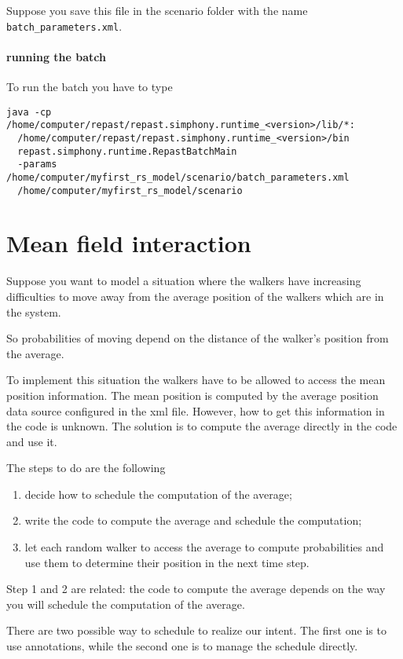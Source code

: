 \documentclass{article}
\begin{document}
Suppose you save this file in the scenario folder with the name \verb+batch_parameters.xml+.

\paragraph{running the batch}

To run the batch you have to type

\begin{verbatim}
java -cp /home/computer/repast/repast.simphony.runtime_<version>/lib/*:
  /home/computer/repast/repast.simphony.runtime_<version>/bin 
  repast.simphony.runtime.RepastBatchMain 
  -params /home/computer/myfirst_rs_model/scenario/batch_parameters.xml 
  /home/computer/myfirst_rs_model/scenario
\end{verbatim}

\section{Mean field interaction}

Suppose you want to model a situation where the walkers have increasing difficulties to move away from the average position of the walkers which are in the system.

So probabilities of moving depend on the distance of the walker's position from the average. 

To implement this situation the walkers have to be allowed to access the mean position information. 
The mean position is computed by the average position data source configured in the xml file. However, how to get this information in the code is unknown. The solution is to compute the average directly in the code and use it.

The steps to do are the following
\begin{enumerate}
	\item decide how to schedule the computation of the average;
	\item write the code to compute the average and schedule the computation;
	\item let each random walker to access the average to compute probabilities and use them to determine their position in the next time step.
\end{enumerate}

Step 1 and 2 are related: the code to compute the average depends on the way you will schedule the computation of the average.

There are two possible way to schedule to realize our intent. The first one is to use annotations, while the second one is to manage the schedule directly.
\end{document}
